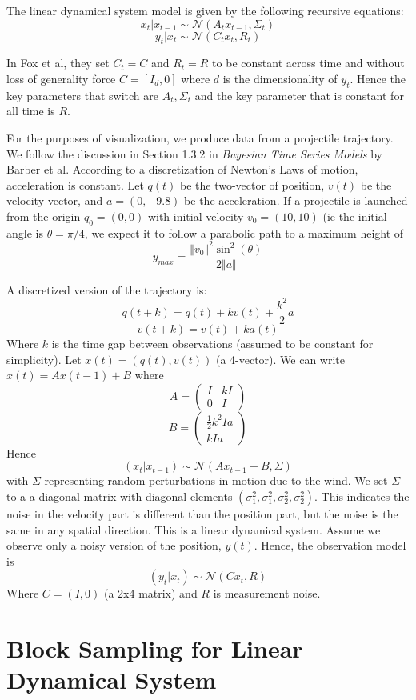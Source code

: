 \documentclass{article} %
\begin{document}
The linear dynamical system model is given by the following recursive
equations: \[x_t|x_{t-1}\sim\mathcal{N}(A_t x_{t-1},\Sigma_t)\]
\[y_t|x_t\sim\mathcal{N}(C_t x_t,R_t)\]

In Fox et al, they set \(C_t=C\) and \(R_t=R\) to be constant across
time and without loss of generality force \(C=[I_d,0]\) where \(d\) is
the dimensionality of \(y_t\). Hence the key parameters that switch are
\(A_t,\Sigma_t\) and the key parameter that is constant for all time is
\(R\).

For the purposes of visualization, we produce data from a projectile
trajectory. We follow the discussion in Section 1.3.2 in \emph{Bayesian
Time Series Models} by Barber et al. According to a discretization of
Newton's Laws of motion, acceleration is constant. Let \(q(t)\) be the
two-vector of position, \(v(t)\) be the velocity vector, and
\(a=(0,-9.8)\) be the acceleration. If a projectile is launched from the
origin \(q_0=(0,0)\) with initial velocity \(v_0=(10,10)\) (ie the
initial angle is \(\theta=\pi/4\), we expect it to follow a parabolic
path to a maximum height of
\[y_{max} = \frac{\Vert v_0 \Vert^2\sin^2(\theta)}{2\Vert a\Vert}\]

A discretized version of the trajectory is:
\[q(t+k) = q(t) + k v(t) + \frac{k^2}{2} a\] \[v(t+k) = v(t) + k a(t) \]
Where \(k\) is the time gap between observations (assumed to be constant
for simplicity). Let \(x(t) = (q(t),v(t))\) (a 4-vector). We can write
\(x(t) = A x(t-1) + B\) where
\[A = \begin{pmatrix} I & kI\\0 & I\end{pmatrix}\]
\[B = \begin{pmatrix} \frac{1}{2}k^2 Ia\\ kIa\end{pmatrix}\] Hence
\[(x_t|x_{t-1})\sim\mathcal{N}\left(Ax_{t-1}+B,\Sigma\right)\] with
\(\Sigma\) representing random perturbations in motion due to the wind.
We set \(\Sigma\) to a a diagonal matrix with diagonal elements
\((\sigma^2_1,\sigma^2_1,\sigma^2_2,\sigma^2_2)\). This indicates the
noise in the velocity part is different than the position part, but the
noise is the same in any spatial direction. This is a linear dynamical
system. Assume we observe only a noisy version of the position,
\(y(t)\). Hence, the observation model is
\[(y_t|x_t)\sim\mathcal{N}\left(Cx_t,R\right)\] Where \(C = (I,0)\) (a
2x4 matrix) and \(R\) is measurement noise.

\section{Block Sampling for Linear Dynamical System} \label{sec:ap_kalman}
\end{document}

